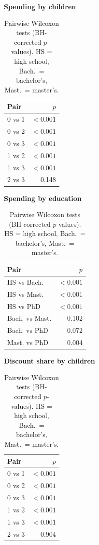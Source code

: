 \documentclass[11pt,a4paper]{article}
\begin{document}
\begin{table}[H]
	\centering
	\small
	\begin{minipage}[t]{0.32\textwidth}
		\centering
		\textbf{Spending by children}\\[0.3em]
		\begin{tabular}{lr}
			\toprule
			Pair  & $p$       \\
			\midrule
			0 vs 1 & $< 0.001$ \\
			0 vs 2 & $< 0.001$ \\
			0 vs 3 & $< 0.001$ \\
			1 vs 2 & $< 0.001$ \\
			1 vs 3 & $< 0.001$ \\
			2 vs 3 & 0.148     \\
			\bottomrule
		\end{tabular}
	\end{minipage}
	\hfill
	\begin{minipage}[t]{0.32\textwidth}
		\centering
		\textbf{Spending by education}\\[0.3em]
		\begin{tabular}{lr}
			\toprule
			Pair                & $p$       \\
			\midrule
			HS vs Bach.         & $< 0.001$ \\
			HS vs Mast.         & $< 0.001$ \\
			HS vs PhD           & $< 0.001$ \\
			Bach. vs Mast.      & 0.102     \\
			Bach. vs PhD        & 0.072     \\
			Mast. vs PhD        & 0.004     \\
			\bottomrule
		\end{tabular}
	\end{minipage}
	\hfill
	\begin{minipage}[t]{0.32\textwidth}
		\centering
		\textbf{Discount share by children}\\[0.3em]
		\begin{tabular}{lr}
			\toprule
			Pair  & $p$       \\
			\midrule
			0 vs 1 & $< 0.001$ \\
			0 vs 2 & $< 0.001$ \\
			0 vs 3 & $< 0.001$ \\
			1 vs 2 & $< 0.001$ \\
			1 vs 3 & $< 0.001$ \\
			2 vs 3 & 0.904     \\
			\bottomrule
		\end{tabular}
	\end{minipage}
	\caption{Pairwise Wilcoxon tests (BH-corrected $p$-values). HS = high school, Bach.\ = bachelor's, Mast.\ = master's.}
	\label{tab:pairwise}
\end{table}
\end{document}
